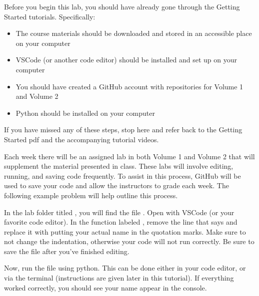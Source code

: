 \label{lab:GitHubIntro}


Before you begin this lab, you should have already gone through the Getting Started tutorials.
Specifically:
\begin{itemize}
\item The course materials should be downloaded and stored in an accessible place on your computer
\item VSCode (or another code editor) should be installed and set up on your computer
\item You should have created a GitHub account with repositories for Volume 1 and Volume 2
\item Python should be installed on your computer
\end{itemize}

If you have missed any of these steps, stop here and refer back to the Getting Started pdf and the accompanying tutorial videos.

Each week there will be an assigned lab in both Volume 1 and Volume 2 that will supplement the material presented in class.
These labs will involve editing, running, and saving code frequently.
To assist in this process, GitHub will be used to save your code and allow the instructors to grade each week.
The following example problem will help outline this process.

\begin{problem}
In the lab folder titled , you will find the file .
Open  with VSCode (or your favorite code editor).
In the function labeled , remove the line that says  and replace it with  putting your actual name in the quotation marks.
Make sure to not change the indentation, otherwise your code will not run correctly.
Be sure to save the file after you've finished editing.

Now, run the file using python.
This can be done either in your code editor, or via the terminal (instructions are given later in this tutorial).
If everything worked correctly, you should see your name appear in the console.
\end{problem}

